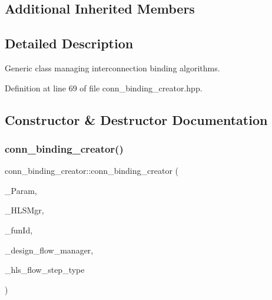 \subsection*{Additional Inherited Members}


\subsection{Detailed Description}
Generic class managing interconnection binding algorithms. 

Definition at line 69 of file conn\+\_\+binding\+\_\+creator.\+hpp.



\subsection{Constructor \& Destructor Documentation}
\mbox{\label{classconn__binding__creator_a09179684d2f2d0c46a0dc248321cfdaf}} 
\subsubsection{\texorpdfstring{conn\+\_\+binding\+\_\+creator()}{conn\_binding\_creator()}}
{\footnotesize\ttfamily conn\+\_\+binding\+\_\+creator\+::conn\+\_\+binding\+\_\+creator (\begin{DoxyParamCaption}\item[{const \hyperlink{Parameter_8hpp_a37841774a6fcb479b597fdf8955eb4ea}{Parameter\+Const\+Ref}}]{\+\_\+\+Param,  }\item[{const \hyperlink{hls__manager_8hpp_acd3842b8589fe52c08fc0b2fcc813bfe}{H\+L\+S\+\_\+manager\+Ref}}]{\+\_\+\+H\+L\+S\+Mgr,  }\item[{unsigned int}]{\+\_\+fun\+Id,  }\item[{const Design\+Flow\+Manager\+Const\+Ref}]{\+\_\+design\+\_\+flow\+\_\+manager,  }\item[{const \hyperlink{hls__step_8hpp_ada16bc22905016180e26fc7e39537f8d}{H\+L\+S\+Flow\+Step\+\_\+\+Type}}]{\+\_\+hls\+\_\+flow\+\_\+step\+\_\+type }\end{DoxyParamCaption})}



